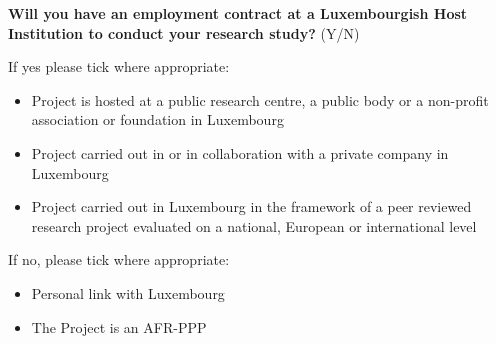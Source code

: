 % 


\textbf{Will you have an employment contract at a Luxembourgish Host Institution
  to conduct your research study?} (Y/N)


If yes please tick where appropriate:
\begin{itemize}
  \item Project is hosted at a public research centre, a public body or a
    non-profit association or foundation in Luxembourg
  \item Project carried out in or in collaboration with a private company in
    Luxembourg
  \item Project carried out in Luxembourg in the framework of a peer reviewed
    research project evaluated on a national, European or international level
\end{itemize}
If no, please tick where appropriate:
\begin{itemize}
  \item Personal link with Luxembourg
  \item The Project is an AFR-PPP
\end{itemize}


% 
